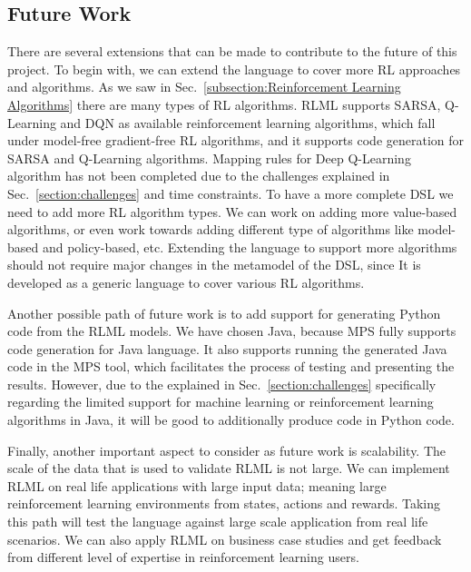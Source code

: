 \documentclass[11pt,letterpaper]{ryersonSGSThesis}
\begin{document}
\begin{ryersonSGSThesis}
    \section{Future Work}
    There are several extensions that can be made to contribute to the future of this project. To begin with, we can extend the language to cover more RL approaches and algorithms. As we saw in Sec.~\ref{subsection:Reinforcement Learning Algorithms} there are many types of RL algorithms. RLML supports SARSA, Q-Learning and DQN as available reinforcement learning algorithms, which fall under model-free gradient-free RL algorithms, and it supports code generation for SARSA and Q-Learning algorithms. Mapping rules for Deep Q-Learning algorithm has not been completed due to the challenges explained in Sec.~\ref{section:challenges} and time constraints. To have a more complete DSL we need to add more RL algorithm types. We can work on adding more value-based algorithms, or even work towards adding different type of algorithms like model-based and policy-based, etc. Extending the language to support more algorithms should not require major changes in the metamodel of the DSL, since It is developed as a generic language to cover various RL algorithms.
     
    Another possible path of future work is to add support for generating Python code from the RLML models. We have chosen Java, because MPS fully supports code generation for Java language. It also supports running the generated Java code in the MPS tool, which facilitates the process of testing and presenting the results. However, due to the explained in Sec.~\ref{section:challenges} specifically regarding the limited support for machine learning or reinforcement learning algorithms in Java, it will be good to additionally produce code in Python code.
    
    Finally, another important aspect to consider as future work is scalability. The scale of the data that is used to validate RLML is not large. We can implement RLML on real life applications with large input data; meaning large reinforcement learning environments from states, actions and rewards. Taking this path will test the language against large scale application from real life scenarios. We can also apply RLML on business case studies and get feedback from different level of expertise in reinforcement learning users.

\end{ryersonSGSThesis}

\clearpage
{}



\end{document}

